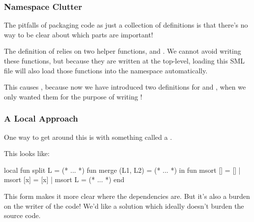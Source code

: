 \documentclass[aspectratio=169]{beamer}
\begin{document}
\begin{frame}[fragile]
  \frametitle{Namespace Clutter}

  The pitfalls of packaging code as just a collection of definitions is
  that there's no way to be clear about which parts are important!

  \pause
  \vspace{\fill}

  The definition of  relies on two helper functions, 
  and . We cannot avoid writing these functions, but because they
  are written at the top-level, loading this SML file will also load those
  functions into the namespace automatically.

  \pause
  \vspace{\fill}

  This causes , because now we have introduced two
  definitions for  and , when we only wanted them
  for the purpose of writing !
\end{frame}

\begin{frame}[fragile]
  \frametitle{A Local Approach}

  One way to get around this is with something called a .

  \pause
  \vspace{\fill}

  This looks like:

  \begin{codeblock}
    local
      fun split L = (* ... *)
      fun merge (L1, L2) = (* ... *)
    in
      fun msort [] = []
        | msort [x] = [x]
        | msort L = (* ... *)
    end
  \end{codeblock}

  \pause
  \vspace{\fill}

  This form makes it more clear where the dependencies are. But it's also a burden
  on the writer of the code! We'd like a solution which ideally doesn't burden
  the source code.
\end{frame}
\end{document}
